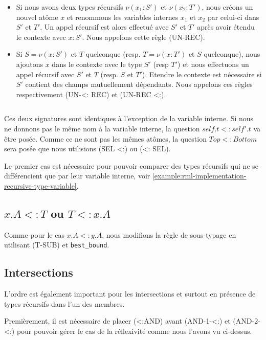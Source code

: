 \begin{itemize}
\item Si nous avons deux types récursifs $\nu(x_{1} : S')$ et $\nu(x_{2} : T')$,
nous créons un nouvel atôme $x$ et renommons les variables internes $x_{1}$ et
$x_{2}$ par celui-ci dans $S'$ et $T'$. Un appel récursif est alors effectué
avec $S'$ et $T'$ après avoir étendu le contexte avec $x : S'$. Nous appelons
cette règle (UN-REC).
\item Si $S = \nu(x : S')$ et $T$ quelconque (resp. $T = \nu(x : T')$ et $S$
  quelconque), nous ajoutons $x$ dans le contexte avec le type $S'$ (resp $T'$) et
  nous effectuons un appel récursif avec $S'$ et $T$ (resp. $S$ et $T'$). Etendre
  le contexte est nécessaire si $S'$ contient des champs mutuellement dépendants.
  Nous appelons ces règles respectivement (UN-<: REC) et (UN-REC <:).
\end{itemize}

\begin{listing}
  \inputminted{OCaml}{codes/rml_implementation_recursive_type.rml}
  \caption{Ces deux signatures sont identiques à l'exception de la variable
    interne. Si nous ne donnons pas le même nom à la variable interne, la
    question $self.t <: self'.t$ va être posée. Comme ce ne sont pas les mêmes
    atômes, la question $Top <: Bottom$ sera posée que nous utilisions (SEL <:) ou
    (<: SEL).}
  \label{example:rml-implementation-recursive-type-variable}
\end{listing}

Le premier cas est nécessaire pour pouvoir comparer des types récursifs qui ne
se différencient que par leur variable interne, voir
\ref{example:rml-implementation-recursive-type-variable}.

\subsection*{$x.A <: T$ ou $T <: x.A$}

Comme pour le cas $x.A <: y.A$, nous modifions la règle de sous-typage en
utilisant (T-SUB) et \verb|best_bound|.

\subsection*{Intersections}

L'ordre est également important pour les intersections et surtout en présence de
types récursifs dans l'un des membres.

Premièrement, il est nécessaire de placer (<:AND) avant (AND-1-<:) et
(AND-2-<:) pour pouvoir gérer le cas de la réflexivité comme nous l'avons vu ci-dessus.

